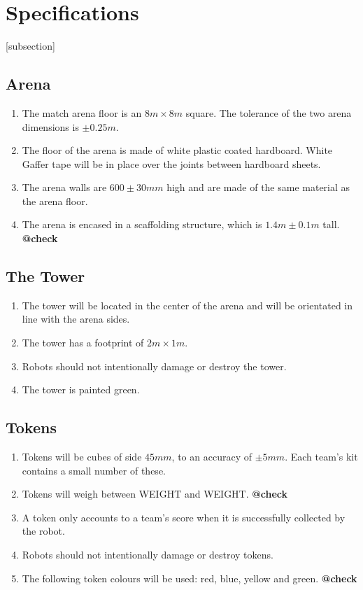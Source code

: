 \section{Specifications}
[subsection]
\newcommand{\rcnii}{\stepcounter{rulei}\arabic{section}.\arabic{subsection}.\arabic{rulei}}
\renewcommand{\labelenumi}{\rcnii}

\subsection{Arena}
\begin{enumerate}
\item The match arena floor is an $8m \times 8m$ square.
 The tolerance of the two arena dimensions is $\pm0.25m$.
\item The floor of the arena is made of white plastic coated hardboard.
 White Gaffer tape will be in place over the joints between hardboard sheets.
\item The arena walls are $600\pm30mm$ high and are made of the same material as the arena floor.
\item The arena is encased in a scaffolding structure, which is $1.4m \pm0.1m$ tall.	\textbf{@check}
\end{enumerate}

\subsection{The Tower}
\label{tower}
\begin {enumerate} 
\item The tower will be located in the center of the arena and will be orientated in line with the arena sides.
\item The tower has a footprint of $2m \times 1m$.
\item Robots should not intentionally damage or destroy the tower.
\item The tower is painted green.
\end {enumerate}

\subsection{Tokens}
\label{tokens}
\begin {enumerate} 
\item Tokens will be cubes of side $45mm$, to an accuracy of $\pm5mm$.
 Each team's kit contains a small number of these.
\item Tokens will weigh between WEIGHT and WEIGHT.	\textbf{@check}
\item A token only accounts to a team's score when it is successfully collected by the robot.
\item Robots should not intentionally damage or destroy tokens.
\item The following token colours will be used: red, blue, yellow and green.	\textbf{@check}
\end {enumerate}

